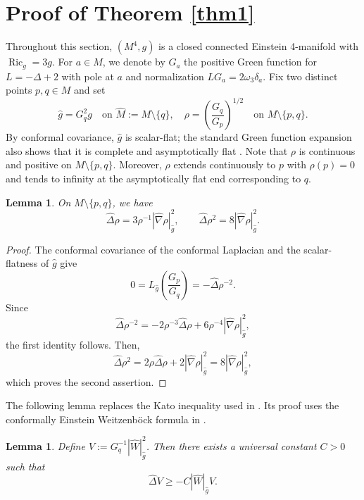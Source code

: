 \documentclass[11pt]{amsart}
\theoremstyle{plain}
\newtheorem{lemma}[theorem]{Lemma}
\numberwithin{equation}{section}
\DeclareMathOperator{\ric}{Ric}
\newcommand{\hd}{\widehat{\Delta}}
\newcommand{\hn}{\widehat{\nabla}}
\newcommand{\hg}{\widehat{g}}
\newcommand{\hw}{\widehat{W}}
\newcommand{\hm}{\widehat{M}}
\begin{document}
\section{Proof of Theorem \ref{thm1}}
Throughout this section, $(M^4,g)$ is a closed connected Einstein 4-manifold with $\ric_g=3g$. For $a\in M$, we denote by $G_a$ the positive Green function for $L=-\Delta+2$ with pole at $a$ and normalization $LG_a=2\omega_3\delta_a$. Fix two distinct points $p,q\in M$ and set
\begin{equation*}
\hg=G_q^2g\quad\text{on $\hm:=M\setminus\{q\}$},\quad \rho=\left(\frac{G_q}{G_p}\right)^{1/2}\quad\text{on $M\setminus\{p,q\}$.}
\end{equation*}
By conformal covariance, $\hg$ is scalar-flat; the standard Green function expansion also shows that it is complete and asymptotically flat \cite{LeeParker1987}. Note that $\rho$ is continuous and positive on $M\setminus\{p,q\}$. Moreover, $\rho$ extends continuously to $p$ with $\rho(p)=0$ and tends to infinity at the asymptotically flat end corresponding to $q$. 

\begin{lemma}\label{lem:rho equations}
On $M\setminus\{p,q\}$, we have
\begin{equation}\label{eq:lem2.1}
\hd\rho=3\rho^{-1}|\hn\rho|^2_{\hg},\qquad \hd\rho^2=8|\hn\rho|_{\hg}^2.
\end{equation}
\end{lemma}

\begin{proof}
The conformal covariance of the conformal Laplacian and the scalar-flatness of $\hg$ give
\begin{equation*}
0=L_{\hg}\left(\frac{G_p}{G_q}\right)=-\hd\rho^{-2}.
\end{equation*}
Since 
\begin{equation*}
\hd\rho^{-2}=-2\rho^{-3}\hd\rho+6\rho^{-4}|\hn\rho|_{\hg}^2,
\end{equation*}
the first identity follows. Then,
\begin{equation*}
\hd\rho^2=2\rho\hd\rho+2|\hn\rho|_{\hg}^2=8|\hn\rho|_{\hg}^2,
\end{equation*}
which proves the second assertion.
\end{proof}

The following lemma replaces the Kato inequality used in \cite{LP25}. Its proof uses the conformally Einstein Weitzenb\"ock formula in \cite{Wu2017}.

\begin{lemma}\label{lem:Kato}
Define $ V:=G_q^{-1}|\hw|^2_{\hg}$. Then there exists a universal constant $C>0$ such that
\begin{equation}\label{eq:lem2.2}
\hd V\ge-C|\hw|_{\hg}V.
\end{equation} 
\end{lemma}
\end{document}
